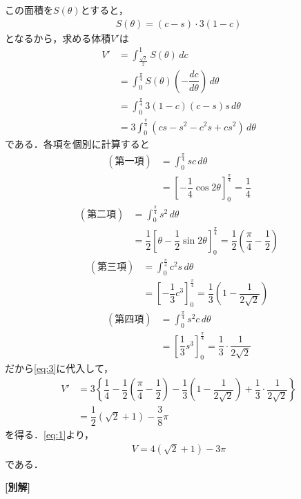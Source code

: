 \documentclass[../../main.tex]{subfiles}
\begin{document}
この面積を$S(\theta)$とすると，
\begin{align}
  S(\theta)=(c-s)\cdot3(1-c)
\end{align}
となるから，求める体積$V'$は
\begin{align}
  V'
  &=\int_{\frac{\sqrt{2}}{2}}^1 S(\theta)\,dc\\
  &=\int_0^{\frac{\pi}{4}}S(\theta)\left(-\dfrac{dc}{d\theta}\right)\,d\theta\\
  &=\int_0^{\frac{\pi}{4}}3(1-c)(c-s)s\,d\theta\\
  &=3\int_0^{\frac{\pi}{4}}(cs-s^2-c^2s+cs^2)\,d\theta \label{eq:3}
\end{align}
である．各項を個別に計算すると
\begin{align}
  (\text{第一項})
  &= \int_0^{\frac{\pi}{4}}sc\,d\theta \\
  &=\left[-\dfrac{1}{4}\cos2\theta\right]_0^{\frac{\pi}{4}}=\dfrac{1}{4}
\end{align}
\begin{align}
  (\text{第二項})
  &=  \int_0^{\frac{\pi}{4}}s^2\,d\theta \\
  &=\dfrac{1}{2}\left[\theta-\dfrac{1}{2}\sin2\theta\right]_0^{\frac{\pi}{4}}
  =\dfrac{1}{2}\left(\dfrac{\pi}{4}-\dfrac{1}{2}\right)
\end{align}
\begin{align}
  (\text{第三項})
  &=  \int_0^{\frac{\pi}{4}}c^2s\,d\theta \\
  &=\left[-\dfrac{1}{3}c^3\right]_0^{\frac{\pi}{4}}
  =\dfrac{1}{3}\left(1-\dfrac{1}{2\sqrt{2}}\right)
\end{align}
\begin{align}
  (\text{第四項})
  &=  \int_0^{\frac{\pi}{4}}s^2c\,d\theta \\
  &=\left[\dfrac{1}{3}s^3\right]_0^{\frac{\pi}{4}}
  =\dfrac{1}{3}\cdot\dfrac{1}{2\sqrt{2}}
\end{align}
だから\cref{eq:3}に代入して，
\begin{align}
  V'
  &=3\left\{\dfrac{1}{4}-\dfrac{1}{2}\left(\dfrac{\pi}{4}-\dfrac{1}{2}\right)
    -\dfrac{1}{3}\left(1-\dfrac{1}{2\sqrt{2}}\right)
  +\dfrac{1}{3}\cdot\dfrac{1}{2\sqrt{2}}\right\}\\
  &=\dfrac{1}{2}(\sqrt{2}+1)-\dfrac{3}{8}\pi
\end{align}
を得る．\cref{eq:1}より，
\begin{align}
  V=4(\sqrt{2}+1)-3\pi
\end{align}
である．

{\bf [別解]}
\end{document}
